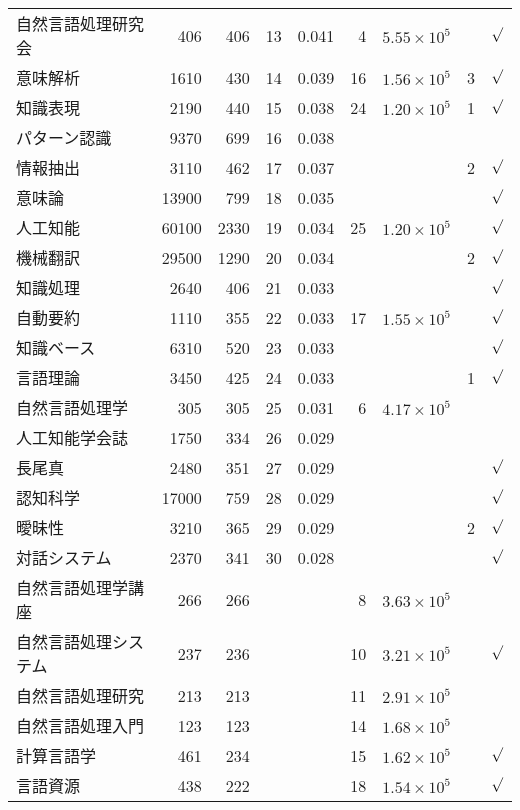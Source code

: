\begin{table}
\begin{center}
\begin{tabular}{|l|rr|rr|rr|cc|}
   自然言語処理研究会 & 406 & 406 & 13 & 0.041 & 4 & $5.55\times 10^5$  &  & $\surd$\\
   意味解析 & 1610 & 430 & 14 & 0.039 & 16 & $1.56\times 10^5$  & 3 & $\surd$\\
   知識表現 & 2190 & 440 & 15 & 0.038 & 24 & $1.20\times 10^5$  & 1 & $\surd$\\
   パターン認識 & 9370 & 699 & 16 & 0.038 &  &  &  & \\
   情報抽出 & 3110 & 462 & 17 & 0.037 &  &  & 2 & $\surd$ \\
   意味論 & 13900 & 799 & 18 & 0.035 &  &  &  & $\surd$\\
   人工知能 & 60100 & 2330 & 19 & 0.034 & 25 & $1.20\times 10^5$    &  & $\surd$\\
   機械翻訳 & 29500 & 1290 & 20 & 0.034 &  &  & 2 & $\surd$ \\
   \hline
   知識処理 & 2640 & 406 & 21 & 0.033 &  &  &  & $\surd$\\
   自動要約 & 1110 & 355 & 22 & 0.033 & 17  & $1.55\times 10^5$  &  & $\surd$\\
   知識ベース & 6310 & 520 & 23 & 0.033 &   & &  & $\surd$\\
   言語理論 & 3450 & 425 & 24 & 0.033 &   & & 1 & $\surd$\\
   自然言語処理学 & 305 & 305 & 25 & 0.031 & 6 & $4.17\times 10^5$  &  & \\
   人工知能学会誌 & 1750 & 334 & 26 & 0.029 &  &  &  & \\
   長尾真 & 2480 & 351 & 27 & 0.029 &  &  &  & $\surd$\\
   認知科学 & 17000 & 759 & 28 & 0.029 &  &  &  & $\surd$\\
   曖昧性 & 3210 & 365 & 29 & 0.029 &  &  & 2 & $\surd$\\
   対話システム & 2370 & 341 & 30 & 0.028 &  &  &  &$\surd$ \\
   \hline
   自然言語処理学講座 & 266 & 266 &  &  &  8 & $3.63\times 10^5$  &  & \\
   自然言語処理システム & 237 & 236 &  &  &  10 & $3.21\times 10^5$  &  & $\surd$\\
   自然言語処理研究 & 213 & 213 &  &  &  11 & $2.91\times 10^5$  &  & \\
   自然言語処理入門 & 123 & 123 &  &  &  14 & $1.68\times 10^5$  &  & \\
   計算言語学 & 461 & 234 &  &  & 15  & $1.62\times 10^5$  &  & $\surd$\\
   言語資源 & 438 & 222 &  &  & 18 & $1.54\times 10^5$  &  & $\surd$\\

\end{tabular}
\end{center}
\end{table}
